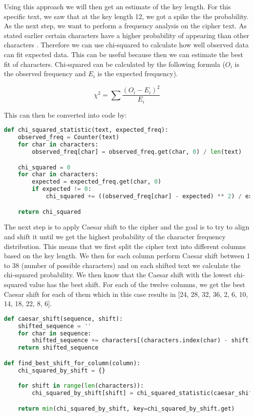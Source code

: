 \documentclass{article}
\begin{document}
Using this approach we will then get an estimate of the key length. For this specific text, we saw that at the key length 12, we got a spike the the probability. As the next step, we want to perform a frequency analysis on the cipher text. As stated earlier certain characters have a higher probability of appearing than other characters \cite{christensen2015cryptanalysis}. Therefore we can use chi-squared to calculate how well observed data can fit expected data. This can be useful because then we can estimate the best fit of characters. Chi-squared can be calculated by the following formula (\(O_i\) is the observed frequency and \(E_i\) is the expected frequency).

\[\chi^2 = \sum \frac{(O_i - E_i)^2}{E_i}\]

This can then be converted into code by:

\begin{lstlisting}[language=Python]
def chi_squared_statistic(text, expected_freq):
    observed_freq = Counter(text)
    for char in characters:
        observed_freq[char] = observed_freq.get(char, 0) / len(text)

    chi_squared = 0
    for char in characters:
        expected = expected_freq.get(char, 0)
        if expected != 0:
            chi_squared += ((observed_freq[char] - expected) ** 2) / expected 

    return chi_squared
\end{lstlisting}

The next step is to apply Caesar shift \cite{shiftpdf3:online} to the cipher and the goal is to try to align and shift it until we get the highest probability of the character frequency distribution. This means that we first split the cipher text into different columns based on the key length. We then for each column perform Caesar shift between 1 to 38 (number of possible characters) and on each shifted text we calculate the chi-squared probability. We then know that the Caesar shift with the lowest chi-squared value has the best shift. For each of the twelve columns, we get the best Caesar shift for each of them which in this case results in [24, 28, 32, 36, 2, 6, 10, 14, 18, 22, 8, 6]. 

\begin{lstlisting}[language=Python]
def caesar_shift(sequence, shift):
    shifted_sequence = ''
    for char in sequence:
        shifted_sequence += characters[(characters.index(char) - shift) % len(characters)]
    return shifted_sequence

def find_best_shift_for_column(column):
    chi_squared_by_shift = {}

    for shift in range(len(characters)):
        chi_squared_by_shift[shift] = chi_squared_statistic(caesar_shift(column, shift), english_letter_freq)

    return min(chi_squared_by_shift, key=chi_squared_by_shift.get)
\end{lstlisting}
\end{document}
